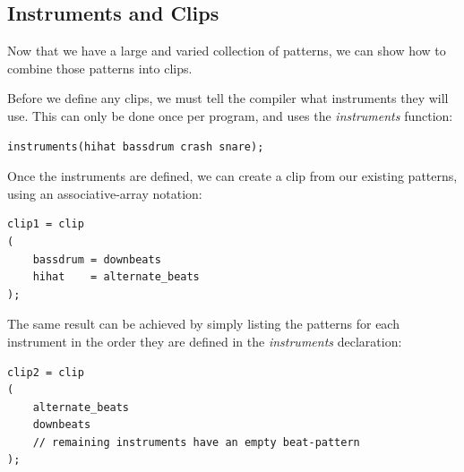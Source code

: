 \documentclass[11pt,twoside]{article}
\begin{document}
\subsection{Instruments and Clips}

Now that we have a large and varied collection of patterns, we can show how to combine those patterns into clips.  

Before we define any clips, we must tell the compiler what instruments they will use.  This can only be done once per program, and uses the \textit{instruments} function:

\begin{verbatim}
instruments(hihat bassdrum crash snare);
\end{verbatim}

Once the instruments are defined, we can create a clip from our existing patterns, using an
associative-array notation:

\begin{verbatim}
clip1 = clip
(
    bassdrum = downbeats
    hihat    = alternate_beats
);
\end{verbatim}

The same result can be achieved by simply listing the patterns for each instrument in the order they are defined in the \textit{instruments} declaration:
\begin{verbatim}
clip2 = clip
(
    alternate_beats
    downbeats
    // remaining instruments have an empty beat-pattern
);

\end{verbatim}
\end{document}
